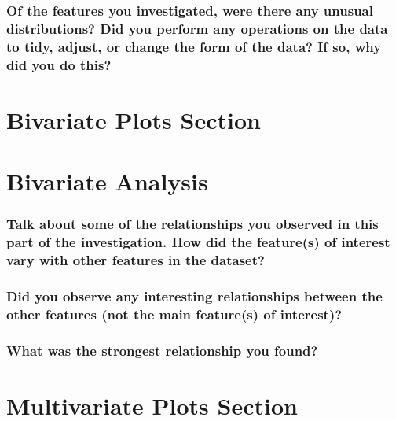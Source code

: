 \documentclass[]{article}
\begin{document}
\subsubsection{Of the features you investigated, were there any unusual
distributions? Did you perform any operations on the data to tidy,
adjust, or change the form of the data? If so, why did you do
this?}\label{of-the-features-you-investigated-were-there-any-unusual-distributions-did-you-perform-any-operations-on-the-data-to-tidy-adjust-or-change-the-form-of-the-data-if-so-why-did-you-do-this}

\section{Bivariate Plots Section}\label{bivariate-plots-section}

\section{Bivariate Analysis}\label{bivariate-analysis}

\subsubsection{Talk about some of the relationships you observed in this
part of the investigation. How did the feature(s) of interest vary with
other features in the
dataset?}\label{talk-about-some-of-the-relationships-you-observed-in-this-part-of-the-investigation.-how-did-the-features-of-interest-vary-with-other-features-in-the-dataset}

\subsubsection{Did you observe any interesting relationships between the
other features (not the main feature(s) of
interest)?}\label{did-you-observe-any-interesting-relationships-between-the-other-features-not-the-main-features-of-interest}

\subsubsection{What was the strongest relationship you
found?}\label{what-was-the-strongest-relationship-you-found}

\section{Multivariate Plots Section}\label{multivariate-plots-section}
\end{document}

